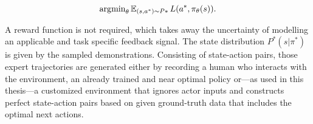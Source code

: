 \begin{equation}
\operatorname{\arg\!\min}_\theta \operatorname{\mathbb{E}}_{(s,a^*) \sim P*} L(a^*, \pi_\theta(s)).
\end{equation}

A reward function is not required, which takes away the uncertainty of modelling an applicable and task specific feedback signal. The state distribution $P^*(s|\pi^*)$ is given by the sampled demonstrations. Consisting of state-action pairs, those expert trajectories are generated either by recording a human who interacts with the environment, an already trained and near optimal policy or—as used in this thesis—a customized environment that ignores actor inputs and constructs perfect state-action pairs based on given ground-truth data that includes the optimal next actions.